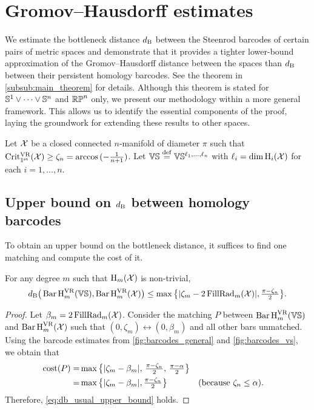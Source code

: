 
\section{Gromov--Hausdorff estimates}\label{prop:db estimate}

We estimate the bottleneck distance $\db$ between the Steenrod barcodes of certain pairs of metric spaces and demonstrate that it provides a tighter lower-bound approximation of the Gromov–Hausdorff distance between the spaces than $\db$ between their persistent homology barcodes.
See the theorem in \cref{subsub:main_theorem} for details.
Although this theorem is stated for $\bS^1\vee\dots\vee \bS^n$ and $\rp^n$ only, we present our methodology within a more general framework.
This allows us to identify the essential components of the proof, laying the groundwork for extending these results to other spaces.

Let $\cX$ be a closed connected \(n\)-manifold of diameter $\pi$ such that $\crit(\cX) \geq \zeta_n = \arccos{(-\tfrac{1}{n+1})}$.
Let $\VS \defeq \VS^{\ell_1, \dots, \ell_n}$ with $\ell_i = \dim \opH_i(\cX)$ for each $i = 1,\dots, n$.


\subsection{Upper bound on $\db$ between homology barcodes}
\label{subsub:db_upper_bound}

To obtain an upper bound on the bottleneck distance, it suffices to find one matching and compute the cost of it.

\medskip\proposition
For any degree $m$ such that $\opH_m(\cX)$ is non-trivial,
\begin{equation}\label{eq:db_usual_upper_bound}
	\db\big(\Hbarc[\field]{m}{\VS}, \Hbarc[\field]{m}{\cX}\big)
	\leq \max\big\{|\zeta_m  - 2\firstdeath{m}{\cX} |, \tfrac{\pi - \zeta_n}{2}\big\}.
\end{equation}

\begin{proof}
    Let $\beta_m = 2\firstdeath{m}{\cX}$.
	Consider the matching $P$ between $\Hbarc[\field]{m}{\VS}$ and $\Hbarc[\field]{m}{\cX}$ such that $(0,\zeta_m ) \leftrightarrow (0, \beta_m )$ and all other bars unmatched.
	Using the barcode estimates from \cref{fig:barcodes_general} and \cref{fig:barcodes_vs}, we obtain that %
	\begin{align*}
		\cost(P)
		= & \max\big\{|\zeta_m  - \beta_m |,\, \tfrac{\pi - \zeta_n}{2},\, \tfrac{\pi - \alpha}{2}\big\} \\
		= & \max\big\{|\zeta_m  - \beta_m |, \tfrac{\pi - \zeta_n}{2}\big\} && \mbox{(because $\zeta_n \leq \alpha$)}.
	\end{align*}
	Therefore, \cref{eq:db_usual_upper_bound} holds.
\end{proof}


